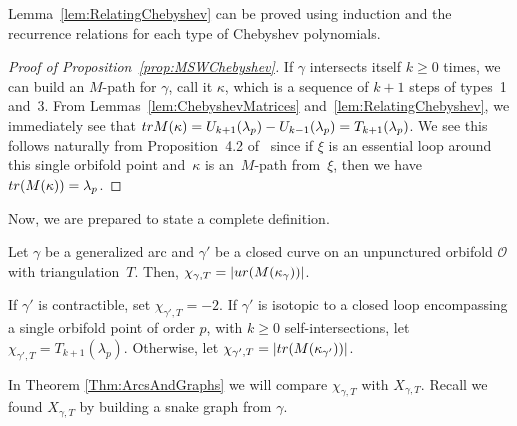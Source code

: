 \documentclass[11pt]{article}
\numberwithin{equation}{section}
\begin{document}
Lemma~\ref{lem:RelatingChebyshev} can be proved using induction and the recurrence relations for each type of Chebyshev polynomials.

\begin{proof}[Proof of Proposition~\ref{prop:MSWChebyshev}]
If $\gamma$ intersects itself $k \geq 0$ times, we can build an $M$-path for $\gamma$, call it $\kappa$, which is a sequence of $k+1$ steps of types~1 and~3. From Lemmas~\ref{lem:ChebyshevMatrices} and~\ref{lem:RelatingChebyshev}, we immediately see that ${\rm tr}M(\kappa) = U_{k+1}(\lambda_p) - U_{k-1}(\lambda_p) = T_{k+1}(\lambda_p)$. We see this follows naturally from Proposition~4.2 of~\cite{MSW-bases} since if $\xi$ is an essential loop around this single orbifold point and~$\kappa$ is an~$M$-path from~$\xi$, then we have ${\rm tr}(M(\kappa)) = \lambda_p$.
\end{proof}

Now, we are prepared to state a complete definition.

\begin{Definition}\label{def:chi_gamma}
Let $\gamma$ be a generalized arc and $\gamma'$ be a closed curve on an unpunctured orbifold $\mathcal{O}$ with triangulation~$T$. Then, $\chi_{\gamma,T} = \vert \emph{ur} (M(\kappa_\gamma)) \vert$.

If $\gamma'$ is contractible, set $\chi_{\gamma',T} = -2$. If $\gamma'$ is isotopic to a closed loop encompassing a single orbifold point of order $p$, with $k \geq 0$ self-intersections, let $\chi_{\gamma',T} = T_{k+1}(\lambda_p)$. Otherwise, let $\chi_{\gamma',T} = \vert {\rm tr} (M(\kappa_{\gamma'})) \vert$.
\end{Definition}

In Theorem \ref{Thm:ArcsAndGraphs} we will compare $\chi_{\gamma,T}$ with $X_{\gamma,T}$. Recall we found $X_{\gamma,T}$ by building a snake graph from $\gamma$.
\end{document}
